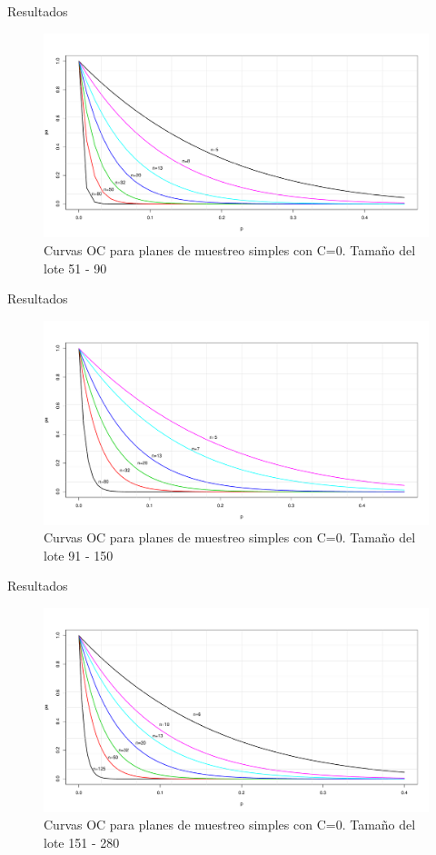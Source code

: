 \documentclass[10pt]{beamer}
\begin{document}
\begin{frame}{Resultados}
\begin{figure}[h!]
  \centering
  \includegraphics[scale=0.33]{FigurasUV/CO5.pdf}
  \caption{Curvas OC para planes de muestreo simples con C=0. Tamaño del lote 51 - 90}
\end{figure}
\end{frame}

\begin{frame}{Resultados}
\begin{figure}[h!]
  \centering
  \includegraphics[scale=0.33]{FigurasUV/CO6.pdf}
  \caption{Curvas OC para planes de muestreo simples con C=0. Tamaño del lote 91 - 150}
\end{figure}
\end{frame}

\begin{frame}{Resultados}
\begin{figure}[h!]
  \centering
  \includegraphics[scale=0.33]{FigurasUV/CO7.pdf}
  \caption{Curvas OC para planes de muestreo simples con C=0. Tamaño del lote 151 - 280}
\end{figure}
\end{frame}
\end{document}
